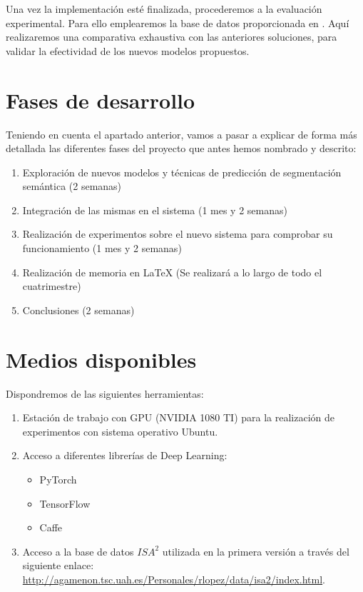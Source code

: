 \documentclass[12pt,oneside,a4paper]{article}
\begin{document}
Una vez la implementación esté finalizada, procederemos a la evaluación experimental. Para ello emplearemos la base de datos proporcionada en \cite{isa2}. Aquí realizaremos una comparativa exhaustiva con las anteriores soluciones, para validar la efectividad de los nuevos modelos propuestos.


\section{Fases de desarrollo}

Teniendo en cuenta el apartado anterior, vamos a pasar a explicar de forma más detallada las diferentes fases del proyecto que antes hemos nombrado y descrito:

\begin{enumerate}
 \item Exploración de nuevos modelos y técnicas de predicción de segmentación semántica (2 semanas)
 \item Integración de las mismas en el sistema (1 mes y 2 semanas)
 \item Realización de experimentos sobre el nuevo sistema para comprobar su funcionamiento (1 mes y 2 semanas)
 \item Realización de memoria en LaTeX (Se realizará a lo largo de todo el cuatrimestre)
 \item Conclusiones (2 semanas)
\end{enumerate}

\section{Medios disponibles}

Dispondremos de las siguientes herramientas:

\begin{enumerate}
	\item Estación de trabajo con GPU (NVIDIA 1080 TI) para la realización de experimentos con sistema operativo Ubuntu.
	\item Acceso a diferentes librerías de Deep Learning:
	\begin{itemize}
	\item PyTorch
	\item TensorFlow 
	\item Caffe
	\end{itemize}
	\item Acceso a la base de datos $ISA^2$ utilizada en la primera versión \cite{isa2} a través del siguiente enlace: \url{http://agamenon.tsc.uah.es/Personales/rlopez/data/isa2/index.html}.
\end{enumerate}

 








\end{document}
